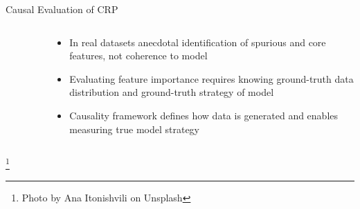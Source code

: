 \documentclass[German, aspectratio=169]{beamer}
\begin{document}
\begin{frame}{Causal Evaluation of CRP}
\begin{columns}
\begin{column}{0.3\textwidth}
\begin{figure}
            \end{figure}
        \end{column}
        \begin{column}{0.7\textwidth}
            \begin{itemize}
                \item In real datasets anecdotal identification of spurious and core features, not coherence to model \cite{Nauta2023}
                      \pause
                \item Evaluating feature importance requires knowing ground-truth data distribution and ground-truth strategy of model\pause
                \item Causality framework defines how data is generated and enables measuring true model strategy
            \end{itemize}
        \end{column}
    \end{columns}
    \footnote[1]{Photo by Ana Itonishvili on Unsplash}
\end{frame}
\end{document}
